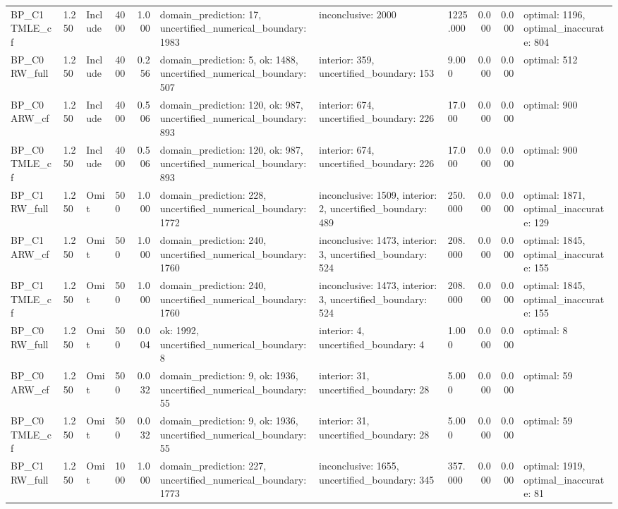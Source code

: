 \begin{tabular}{llllrlllrrl}
BP\_C1 TMLE\_cf & 1.250 & Include & 4000 & 1.000 & domain\_prediction: 17, uncertified\_numerical\_boundary: 1983 & inconclusive: 2000 & 1225.000 & 0.000 & 0.000 & optimal: 1196, optimal\_inaccurate: 804 \\
BP\_C0 RW\_full & 1.250 & Include & 4000 & 0.256 & domain\_prediction: 5, ok: 1488, uncertified\_numerical\_boundary: 507 & interior: 359, uncertified\_boundary: 153 & 9.000 & 0.000 & 0.000 & optimal: 512 \\
BP\_C0 ARW\_cf & 1.250 & Include & 4000 & 0.506 & domain\_prediction: 120, ok: 987, uncertified\_numerical\_boundary: 893 & interior: 674, uncertified\_boundary: 226 & 17.000 & 0.000 & 0.000 & optimal: 900 \\
BP\_C0 TMLE\_cf & 1.250 & Include & 4000 & 0.506 & domain\_prediction: 120, ok: 987, uncertified\_numerical\_boundary: 893 & interior: 674, uncertified\_boundary: 226 & 17.000 & 0.000 & 0.000 & optimal: 900 \\
BP\_C1 RW\_full & 1.250 & Omit & 500 & 1.000 & domain\_prediction: 228, uncertified\_numerical\_boundary: 1772 & inconclusive: 1509, interior: 2, uncertified\_boundary: 489 & 250.000 & 0.000 & 0.000 & optimal: 1871, optimal\_inaccurate: 129 \\
BP\_C1 ARW\_cf & 1.250 & Omit & 500 & 1.000 & domain\_prediction: 240, uncertified\_numerical\_boundary: 1760 & inconclusive: 1473, interior: 3, uncertified\_boundary: 524 & 208.000 & 0.000 & 0.000 & optimal: 1845, optimal\_inaccurate: 155 \\
BP\_C1 TMLE\_cf & 1.250 & Omit & 500 & 1.000 & domain\_prediction: 240, uncertified\_numerical\_boundary: 1760 & inconclusive: 1473, interior: 3, uncertified\_boundary: 524 & 208.000 & 0.000 & 0.000 & optimal: 1845, optimal\_inaccurate: 155 \\
BP\_C0 RW\_full & 1.250 & Omit & 500 & 0.004 & ok: 1992, uncertified\_numerical\_boundary: 8 & interior: 4, uncertified\_boundary: 4 & 1.000 & 0.000 & 0.000 & optimal: 8 \\
BP\_C0 ARW\_cf & 1.250 & Omit & 500 & 0.032 & domain\_prediction: 9, ok: 1936, uncertified\_numerical\_boundary: 55 & interior: 31, uncertified\_boundary: 28 & 5.000 & 0.000 & 0.000 & optimal: 59 \\
BP\_C0 TMLE\_cf & 1.250 & Omit & 500 & 0.032 & domain\_prediction: 9, ok: 1936, uncertified\_numerical\_boundary: 55 & interior: 31, uncertified\_boundary: 28 & 5.000 & 0.000 & 0.000 & optimal: 59 \\
BP\_C1 RW\_full & 1.250 & Omit & 1000 & 1.000 & domain\_prediction: 227, uncertified\_numerical\_boundary: 1773 & inconclusive: 1655, uncertified\_boundary: 345 & 357.000 & 0.000 & 0.000 & optimal: 1919, optimal\_inaccurate: 81 \\

\end{tabular}
